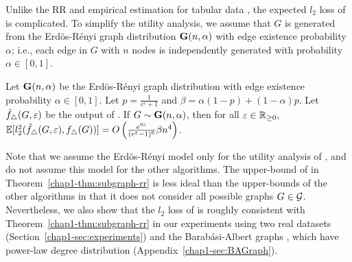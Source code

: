 Unlike the RR and empirical estimation for tabular data \cite{Kairouz_ICML16}, the expected $l_2$ loss of  is complicated. 
To simplify the utility analysis, we assume that $G$ is generated from the Erd\"os-R\'enyi graph distribution $\mathbf{G}(n,\alpha)$ with edge existence probability $\alpha$; i.e., each edge in $G$ with $n$ nodes is independently generated with probability $\alpha \in [0,1]$.

\begin{theorem}\label{chap1-thm:subgraph-rr}
  Let $\mathbf{G}(n,\alpha)$ be the Erd\"os-R\'enyi graph distribution with edge existence probability $\alpha \in [0,1]$. 
  Let $p = \frac{1}{e^\epsilon+1}$ and 
  $\beta = \alpha(1-p) + (1-\alpha)p$. 
  Let 
  $\hat{f}_{\triangle}(G, \varepsilon)$ 
  be the output of 
  .
  If 
  $G \sim \mathbf{G}(n,\alpha)$, 
  then for all 
  $\varepsilon \in \mathbb{R}_{\ge0}$, 
  $\mathbb{E}[l_2^2(\hat{f}_{\triangle}(G, \varepsilon),
  f_\triangle(G))] = 
  O\left(\frac{e^{6\varepsilon}}{(e^\varepsilon-1)^6}\beta n^4\right)$.
\end{theorem}


Note that we assume the Erd\"os-R\'enyi model only for the utility analysis of , and do not assume this model for the other algorithms. 
The upper-bound of  in Theorem~\ref{chap1-thm:subgraph-rr} is less ideal than the upper-bounds of the other algorithms in that it does not consider all possible graphs $G \in \mathcal{G}$. 
Nevertheless, we also show that the $l_2$ loss of  is roughly consistent with Theorem~\ref{chap1-thm:subgraph-rr} in our experiments using two real datasets (Section~\ref{chap1-sec:experiments}) and 
the Barab\'{a}si-Albert graphs \cite{NetworkScience}, which have power-law degree distribution (Appendix~\ref{chap1-sec:BAGraph}). 

